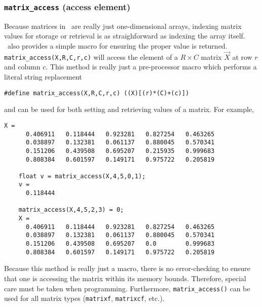 \subsubsection{{\tt matrix\_access} (access element)}
\label{module:matrix:access}
Because matrices in \liquid\ are really just one-dimensional arrays, indexing
matrix values for storage or retrieval is as straighforward as indexing the
array itself.
\liquid\ also provides a simple macro for ensuring the proper value is
returned.
{\tt matrix\_access(X,R,C,r,c)} will access the element of a $R \times C$
matrix $\vec{X}$ at row $r$ and column $c$.
This method is really just a pre-processor macro which performs a literal
string replacement
\begin{Verbatim}[fontsize=\small]
  #define matrix_access(X,R,C,r,c) ((X)[(r)*(C)+(c)])
\end{Verbatim}
and can be used for both setting and retrieving values of a matrix.
For example,
\begin{Verbatim}[fontsize=\small]
    X = 
      0.406911   0.118444   0.923281   0.827254   0.463265
      0.038897   0.132381   0.061137   0.880045   0.570341
      0.151206   0.439508   0.695207   0.215935   0.999683
      0.808384   0.601597   0.149171   0.975722   0.205819

    float v = matrix_access(X,4,5,0,1);
    v =
      0.118444

    matrix_access(X,4,5,2,3) = 0;
    X =
      0.406911   0.118444   0.923281   0.827254   0.463265
      0.038897   0.132381   0.061137   0.880045   0.570341
      0.151206   0.439508   0.695207   0.0        0.999683
      0.808384   0.601597   0.149171   0.975722   0.205819
\end{Verbatim}
Because this method is really just a macro, there is no error-checking to
ensure that one is accessing the matrix within its memory bounds.
Therefore, special care must be taken when programming.
Furthermore, {\tt matrix\_access()} can be used for all matrix types
({\tt matrixf}, {\tt matrixcf}, etc.).

